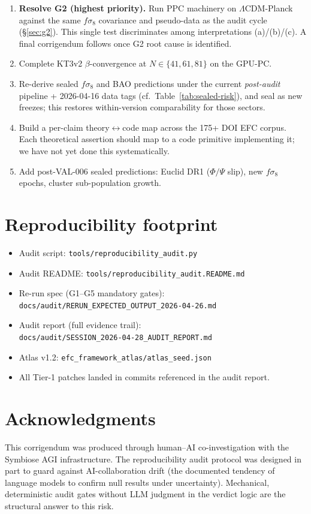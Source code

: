 \documentclass[11pt]{article}
\begin{document}
\begin{enumerate}[leftmargin=*]
\item \textbf{Resolve G2 (highest priority).} Run PPC machinery on
$\Lambda$CDM-Planck against the same $f\sigma_8$ covariance and
pseudo-data as the audit cycle (\S\ref{sec:g2}). This single test
discriminates among interpretations (a)/(b)/(c). A final corrigendum
follows once G2 root cause is identified.
\item Complete KT3v2 $\beta$-convergence at $N\!\in\!\{41,61,81\}$ on the GPU-PC.
\item Re-derive sealed $f\sigma_8$ and BAO predictions under the current
\emph{post-audit} pipeline + 2026-04-16 data tags (cf.\
Table~\ref{tab:sealed-risk}), and seal as new freezes; this restores
within-version comparability for those sectors.
\item Build a per-claim theory$\leftrightarrow$code map across the 175+
DOI EFC corpus. Each theoretical assertion should map to a code primitive
implementing it; we have not yet done this systematically.
\item Add post-VAL-006 sealed predictions: Euclid DR1 ($\Phi/\Psi$ slip),
new $f\sigma_8$ epochs, cluster sub-population growth.
\end{enumerate}

\section*{Reproducibility footprint}

\begin{itemize}[leftmargin=*,nosep]
\item Audit script: \texttt{tools/reproducibility\_audit.py}
\item Audit README: \texttt{tools/reproducibility\_audit.README.md}
\item Re-run spec (G1--G5 mandatory gates):\\
\texttt{docs/audit/RERUN\_EXPECTED\_OUTPUT\_2026-04-26.md}
\item Audit report (full evidence trail):\\
\texttt{docs/audit/SESSION\_2026-04-28\_AUDIT\_REPORT.md}
\item Atlas v1.2: \texttt{efc\_framework\_atlas/atlas\_seed.json}
\item All Tier-1 patches landed in commits referenced in the audit report.
\end{itemize}

\section*{Acknowledgments}

This corrigendum was produced through human--AI co-investigation with the
Symbiose AGI infrastructure. The reproducibility audit protocol was
designed in part to guard against AI-collaboration drift (the
documented tendency of language models to confirm null results under
uncertainty). Mechanical, deterministic audit gates without LLM judgment
in the verdict logic are the structural answer to this risk.
\end{document}

